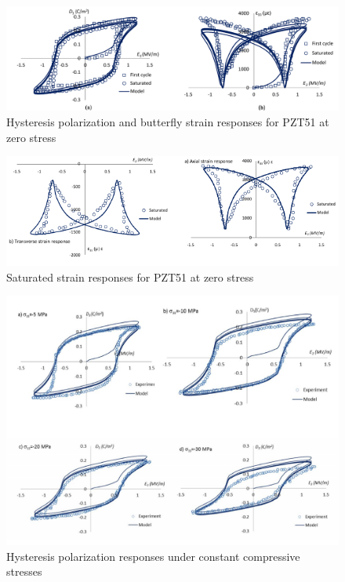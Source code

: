 \begin{figure}
\centering
\includegraphics[width=5.0in]{./chap_2_pol_sw/figures/hysteresis_polarization_butterfly_strainres_ponsespzt_51_zero_stress.pdf}
\caption{Hysteresis polarization and butterfly strain responses for PZT51 at zero stress}
\label{fig:hysteresis_polarization_butterfly_strainres_ponsespzt_51_zerostress}
\end{figure}
  
\begin{figure} 
\centering
\includegraphics[width=5.0in]{./chap_2_pol_sw/figures/saturated_strain_responses_pzt51_zero_stress.pdf} 
\caption{Saturated strain responses for PZT51 at zero stress}
\label{saturated_strain_responses_pzt51_zero_stress}
\end{figure}

\begin{figure} 
\centering 
\includegraphics[width=5.0in]{./chap_2_pol_sw/figures/hysteresis_polarization_responses_under_constant_compressive_stresses.pdf} 
\caption{Hysteresis polarization responses under constant compressive stresses}
\label{hysteresis_polarization_responses_under_constant_compressive_stresses}
\end{figure}

